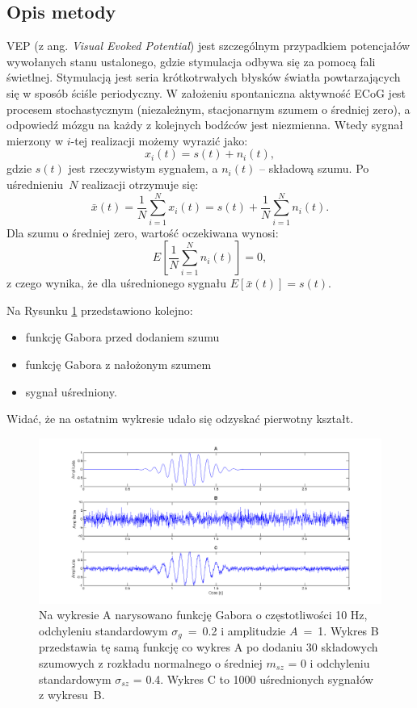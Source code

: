 \documentclass{pracamgr_2}
\begin{document}
\subsection{Opis metody}
VEP (z ang. \textit{Visual Evoked Potential}) jest szczególnym przypadkiem potencjałów wywołanych stanu ustalonego, gdzie stymulacja odbywa się za pomocą fali świetlnej. Stymulacją jest seria krótkotrwałych błysków światła powtarzających się w sposób ściśle periodyczny. W założeniu spontaniczna aktywność ECoG jest procesem stochastycznym (niezależnym, stacjonarnym szumem o średniej zero), a odpowiedź mózgu na każdy z kolejnych bodźców jest niezmienna. Wtedy sygnał mierzony w $i$-tej realizacji możemy wyrazić jako:
\begin{equation}
x_i(t) = s(t) + n_i(t),
\end{equation}
gdzie $s(t)$ jest rzeczywistym sygnałem, a $n_i(t)$ -- składową szumu. Po uśrednieniu~$N$ realizacji otrzymuje się:
\begin{equation}
\bar{x}(t) = \frac{1}{N} \sum_{i=1}^{N} x_i(t) = s(t) + \frac{1}{N}\sum_{i=1}^{N} n_i(t).
\end{equation}
Dla szumu o średniej zero, wartość oczekiwana wynosi:
\begin{equation}
E\left[ \frac{1}{N}\sum_{i=1}^{N} n_i(t)\right] = 0, 
\end{equation}
z czego wynika, że dla uśrednionego sygnału $E\left[ \bar{x}(t) \right] = s(t).$

Na Rysunku \ref{rys:gabor} przedstawiono kolejno:
\begin{itemize}
	\item funkcję Gabora przed dodaniem szumu
	\item funkcję Gabora z nałożonym szumem
	\item sygnał uśredniony.
\end{itemize}
Widać, że na ostatnim wykresie udało się odzyskać pierwotny kształt.
\begin{figure}[h]
	\begin{center}
		\includegraphics[width=\columnwidth]{gabor.png}
	\end{center}
	\caption{Na wykresie A narysowano funkcję Gabora o częstotliwości 10 Hz, odchyleniu standardowym $\sigma_g$~=~0.2 i amplitudzie $A$~=~1. Wykres B przedstawia tę samą funkcję co wykres A po dodaniu 30 składowych szumowych z rozkładu normalnego o średniej $m_{sz}$ = 0 i odchyleniu standardowym $\sigma_{sz}$ = 0.4. Wykres C to 1000 uśrednionych sygnałów z wykresu~B.}
	\label{rys:gabor}
\end{figure}
\end{document}
